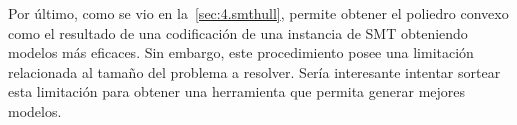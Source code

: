 Por último, como se vio en la~\autoref{sec:4.smthull}, \pachtool permite obtener el poliedro convexo como el resultado de una
codificación de una instancia de SMT obteniendo modelos más eficaces. Sin embargo, este procedimiento posee una limitación
relacionada al tamaño del problema a resolver. Sería interesante intentar sortear esta limitación para obtener una herramienta que
permita generar mejores modelos.

